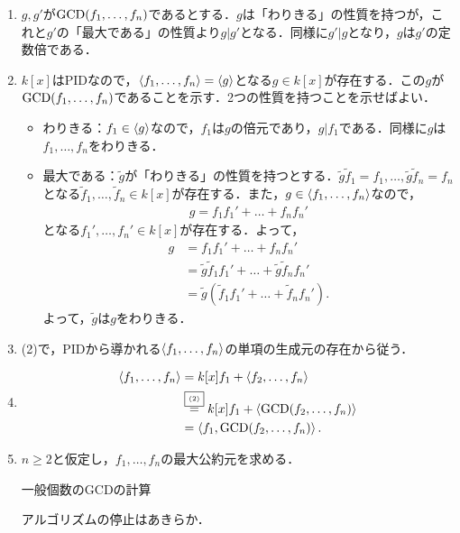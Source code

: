 \documentclass[9pt]{ltjsarticle}
\begin{document}
\begin{myproof}
 \begin{enumerate}[label=(\arabic*)]
  \item $g,g'$が${\rm GCD}(f_1,\dots,f_n)$であるとする．$g$は「わりきる」の性質を持つが，これと$g'$の「最大である」の性質より$g| g'$となる．同様に$g' | g$となり，$g$は$g'$の定数倍である．
  \item $k[x]$はPIDなので，$\left\langle f_1,\dots,f_n \right\rangle=\left\langle g \right\rangle$となる$g\in k[x]$が存在する．この$g$が${\rm GCD}(f_1,\dots,f_n)$であることを示す．2つの性質を持つことを示せばよい．
\begin{itemize}
 \item わりきる：$f_1 \in \left\langle g \right\rangle$なので，$f_1$は$g$の倍元であり，$g|f_1$である．同様に$g$は$f_1,\dots,f_n$をわりきる．
 \item 最大である：$\tilde g$が「わりきる」の性質を持つとする．$\tilde g \tilde f_1= f_1 ,\dots, \tilde g \tilde f_n= f_n $となる$\tilde f_1,\dots,\tilde f_n \in k[x]$が存在する．また，$g\in \left\langle f_1,\dots,f_n \right\rangle$なので，
\begin{align}
 g = f_1 f_1' + \dots + f_n f_n'
\end{align}
となる$f_1',\dots,f_n' \in k[x]$が存在する．よって，
\begin{align}
 g &= f_1 f_1' + \dots + f_n f_n'\\
 & =
\tilde g \tilde f_1 f_1' + \dots + \tilde g \tilde f_n f_n'\\
 & =
\tilde g(\tilde f_1 f_1' + \dots + \tilde f_n f_n').
\end{align}
よって，$\tilde g$は$g$をわりきる．
\end{itemize}
  \item (2)で，PIDから導かれる$\left\langle f_1,\dots,f_n \right\rangle$の単項の生成元の存在から従う．
  \item
\begin{align}
 \left\langle f_1,\dots,f_n \right\rangle &=
k[x]f_1 + \left\langle f_2,\dots,f_n \right\rangle\\
 & \overset{\text{\fbox{\tiny (2)}}}{=}
k[x]f_1 + \left\langle {\rm GCD}(f_2,\dots,f_n) \right\rangle\\
 & =
\left\langle f_1, {\rm GCD}(f_2,\dots,f_n) \right\rangle.
\end{align}
  \item
$n\ge 2$と仮定し，$f_1,\dots,f_n$の最大公約元を求める．
\begin{algorithm}[H]
\caption{一般個数のGCDの計算}
 \begin{algorithmic}[1]
  \ENDWHILE{}
 \end{algorithmic}
\end{algorithm}
アルゴリズムの停止はあきらか．


\end{enumerate}
\end{myproof}
\end{document}

